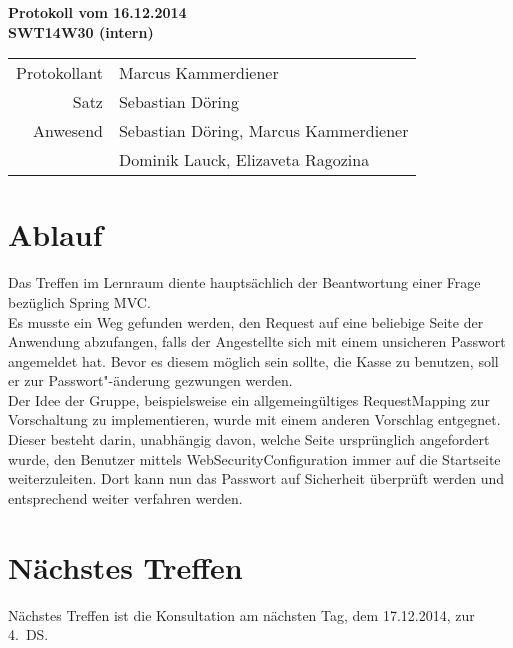 \documentclass{scrartcl}
\begin{document}
\begin{center}
\LARGE \bf{Protokoll vom 16.12.2014 \\
SWT14W30 (intern)}
\end{center}

\begin{tabular}{rp{10cm}}
Protokollant & Marcus Kammerdiener \\
Satz & Sebastian Döring \\
Anwesend & Sebastian Döring, Marcus Kammerdiener \\
         & Dominik Lauck, Elizaveta Ragozina \\
\end{tabular}

\vspace*{3em}

\section{Ablauf}
Das Treffen im Lernraum diente hauptsächlich der Beantwortung einer Frage bezüglich Spring MVC.\\
Es musste ein Weg gefunden werden, den Request auf eine beliebige Seite der Anwendung abzufangen, falls der Angestellte sich mit einem unsicheren Passwort angemeldet hat. Bevor es diesem möglich sein sollte, die Kasse zu benutzen, soll er zur Passwort"-änderung gezwungen werden.\\
Der Idee der Gruppe, beispielsweise ein allgemeingültiges RequestMapping zur Vorschaltung zu implementieren, wurde mit einem anderen Vorschlag entgegnet. Dieser besteht darin, unabhängig davon, welche Seite ursprünglich angefordert wurde, den Benutzer mittels WebSecurityConfiguration immer auf die Startseite weiterzuleiten. Dort kann nun das Passwort auf Sicherheit überprüft werden und entsprechend weiter verfahren werden.

\vspace*{1em}

\section{N\"achstes Treffen}
Nächstes Treffen ist die Konsultation am nächsten Tag, dem 17.12.2014, zur 4.~DS.
\end{document}
